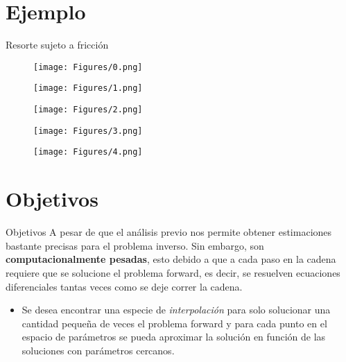 \documentclass[10pt]{beamer}
\begin{document}
\section{Ejemplo}


\begin{frame}{Resorte sujeto a fricción}
  \begin{figure}
      \centering 
      \texttt{[image: Figures/0.png]} 
  \end{figure} 
\end{frame}

\begin{frame}
  \begin{figure}
      \centering 
      \texttt{[image: Figures/1.png]} 
  \end{figure} 
\end{frame}

\begin{frame}
  \begin{figure}[H] 
      \centering 
      \texttt{[image: Figures/2.png]} 
  \end{figure} 
\end{frame}

\begin{frame}
  \begin{figure}[H] 
      \centering 
      \texttt{[image: Figures/3.png]} 
  \end{figure} 
\end{frame}


\begin{frame}
  \begin{figure}[H] 
      \centering 
      \texttt{[image: Figures/4.png]} 
  \end{figure} 
\end{frame}



\section{Objetivos}


\begin{frame}{Objetivos}
  A pesar de que el análisis previo nos permite obtener estimaciones bastante precisas para el problema inverso. Sin embargo, son \textbf{computacionalmente pesadas}, esto debido a que a cada paso en la cadena requiere que se solucione el problema forward, es decir, se resuelven ecuaciones diferenciales tantas veces como se deje correr la cadena. 
  \begin{itemize}
    \item 
    Se desea encontrar una especie de \textit{interpolación} para solo solucionar una cantidad pequeña de veces el problema forward y para cada punto en el espacio de parámetros se pueda aproximar la solución en función de las soluciones con parámetros cercanos.
  \end{itemize}

\end{frame}
\end{document}
